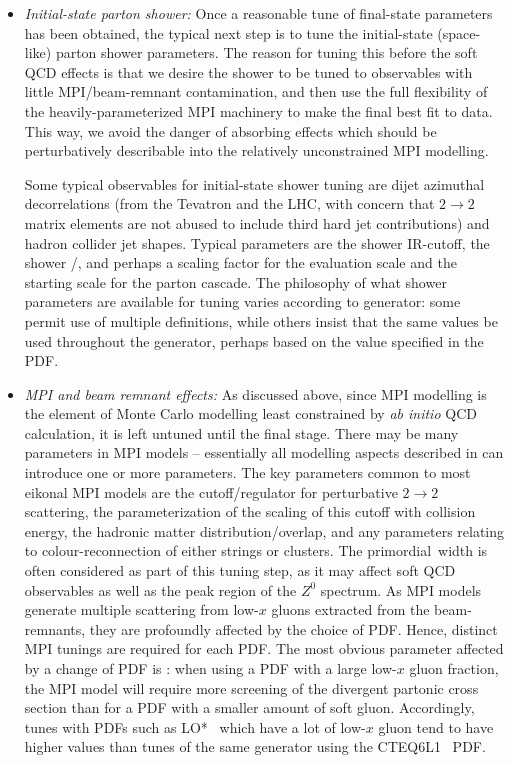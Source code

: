 \begin{itemize}
\item {\em Initial-state parton shower:} Once a reasonable tune of final-state
  parameters has been obtained, the typical next step is to tune the
  initial-state (space-like) parton shower parameters. The reason for tuning
  this before the soft QCD effects is that we desire the shower to be tuned
  to observables with little MPI/beam-remnant contamination, and then use the
  full flexibility of the heavily-parameterized MPI machinery to make the final
  best fit to data. This way, we avoid the danger of absorbing effects which
  should be perturbatively describable into the relatively unconstrained MPI
  modelling.

  Some typical observables for initial-state shower tuning are dijet azimuthal
  decorrelations (from the Tevatron and the LHC, with concern that $2 \to 2$ matrix
  elements are not abused to include third hard jet contributions) and hadron
  collider jet shapes. Typical parameters are the shower IR-cutoff, the shower
  \alphaS/\LambdaQCD, and perhaps a scaling factor for the \alphaS evaluation
  scale and the starting scale for the parton cascade. The philosophy of what
  shower parameters are available for tuning varies according to generator: some
  permit use of multiple \alphaS definitions, while others insist that the same
  values be used throughout the generator, perhaps based on the value specified
  in the PDF.

\item {\em MPI and beam remnant effects:} As discussed above, since MPI modelling is
  the element of Monte Carlo modelling least constrained by \textit{ab initio} QCD
  calculation, it is left untuned until the final stage. There may be many
  parameters in MPI models -- essentially all modelling aspects described in
   can introduce one or more parameters.  The key parameters
  common to most eikonal MPI models are the  cutoff/regulator
  for perturbative $2 \to 2$ scattering, the parameterization of the scaling of
  this cutoff with collision energy, the hadronic matter distribution/overlap,
  and any parameters relating to colour-reconnection of either strings or
  clusters. The primordial~\kt width is often considered as part of this tuning
  step, as it may affect soft QCD observables as well as the peak region of the
  $Z^0$ \pt spectrum. As MPI models generate multiple scattering from low-$x$
  gluons extracted from the beam-remnants, they are profoundly affected by the
  choice of PDF. Hence, distinct MPI tunings are required for each PDF. The most
  obvious parameter affected by a change of PDF is : when using
  a PDF with a large low-$x$ gluon fraction, the MPI model will require more
  screening of the divergent partonic cross section than for a PDF with a
  smaller amount of soft gluon. Accordingly, tunes with PDFs such as
  LO*~\cite{Sherstnev:2007nd} which have a lot of low-$x$ gluon tend to have
  higher  values than tunes of the same generator using \eg the
  CTEQ6L1~\cite{Pumplin:2002vw} PDF.


\end{itemize}
